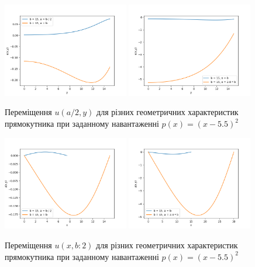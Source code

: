 \begin{figure}[H]
    \begin{center}
        \includegraphics[width=0.49\textwidth, scale=1]{images/results/static_1/u(a:2,y)1.png}
        \includegraphics[width=0.49\textwidth, scale=1]{images/results/static_1/u(a:2,y)2.png}
        \caption{Переміщення $u(a/2, y)$ для різних геометричних характеристик прямокутника при заданному навантаженні $p(x) = (x - 5.5)^2$}\label{static_1_u(a:2,y)}
    \end{center}
\end{figure}
\begin{figure}[h!]
    \begin{center}
        \includegraphics[width=0.49\textwidth, scale=1]{images/results/static_1/u(x,b:2)1.png}
        \includegraphics[width=0.49\textwidth, scale=1]{images/results/static_1/u(x,b:2)2.png}
        \caption{Переміщення $u(x, b:2)$ для різних геометричних характеристик прямокутника при заданному навантаженні $p(x) = (x - 5.5)^2$}\label{static_1_u(x,b:2)}
    \end{center}
\end{figure}

